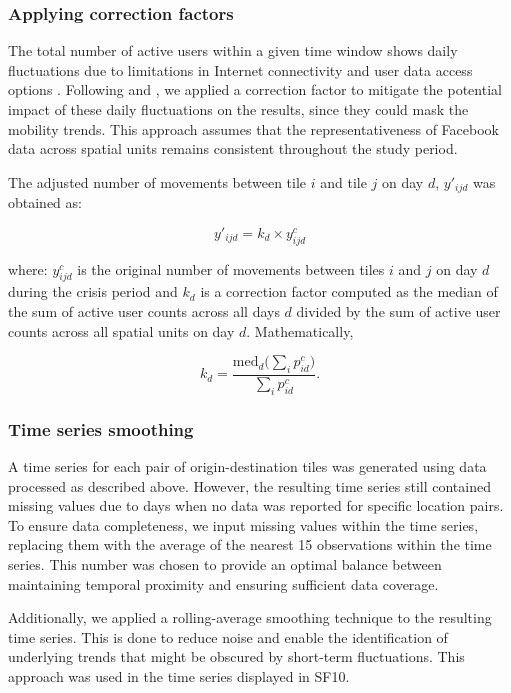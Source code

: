 \documentclass[fleqn,10pt]{wlscirep}
\begin{document}
\subsubsection*{Applying correction factors}

The total number of active users within a given time window shows daily fluctuations due to limitations in Internet connectivity and user data access options \cite{Maas19}. Following \cite{yabe2020} and \cite{duan2024}, we applied a correction factor to mitigate the potential impact of these daily fluctuations on the results, since they could mask the mobility trends. This approach assumes that the representativeness of Facebook data across spatial units remains consistent throughout the study period.

The adjusted number of movements between tile $i$ and tile $j$ on day $d$, $y'_{ijd}$ was obtained as:

\begin{equation}
y'_{ijd} = k_d \times y^c_{ijd}
\end{equation}

where: $y^c_{ijd}$ is the original number of movements between tiles $i$ and $j$ on day $d$ during the crisis period and $k_d$ is a correction factor computed as the median of the sum of active user counts across all days $d$ divided by the sum of active user counts across all spatial units on day $d$. Mathematically,

\begin{equation}
k_d = \dfrac{\mbox{med}_d\big(\sum_i{p^c_{id}}\big)}{\sum_i{p^c_{id}}}.
\end{equation}

\subsubsection*{Time series smoothing}

A time series for each pair of origin-destination tiles was generated using data processed as described above. However, the resulting time series still contained missing values due to days when no data was reported for specific location pairs. To ensure data completeness, we input missing values within the time series, replacing them with the average of the nearest 15 observations within the time series. This number was chosen to provide an optimal balance between maintaining temporal proximity and ensuring sufficient data coverage.

Additionally, we applied a rolling-average smoothing technique to the resulting time series. This is done to reduce noise and enable the identification of underlying trends that might be obscured by short-term fluctuations. This approach was used in the time series displayed in SF10.
\end{document}
